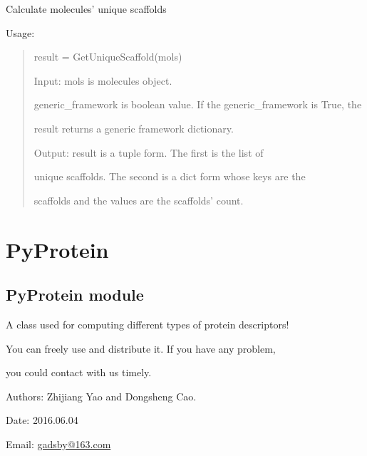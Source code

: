 \documentclass[letterpaper,10pt,english]{sphinxmanual}
\begin{document}

\begin{fulllineitems}
\label{reference/Scaffolds:Scaffolds.GetUniqueScaffold}
Calculate molecules' unique scaffolds

Usage:
\begin{quote}

result = GetUniqueScaffold(mols)

Input: mols is molecules object.

generic\_framework is boolean value. If the generic\_framework is True, the

result returns a generic framework dictionary.

Output: result is a tuple form. The first is the list of

unique scaffolds. The second is a dict form whose keys are the

scaffolds and the values are the scaffolds' count.
\end{quote}

\end{fulllineitems}



\section{PyProtein}
\label{reference/PyProtein:pyprotein}\label{reference/PyProtein::doc}

\subsection{PyProtein module}
\label{reference/PyProteinclass:module-PyProtein}\label{reference/PyProteinclass:pyprotein-module}\label{reference/PyProteinclass::doc}
A class used for computing different types of protein descriptors!

You can freely use and distribute it. If you have any problem,

you could contact with us timely.

Authors: Zhijiang Yao and Dongsheng Cao.

Date: 2016.06.04

Email: \href{mailto:gadsby@163.com}{gadsby@163.com}
\end{document}
